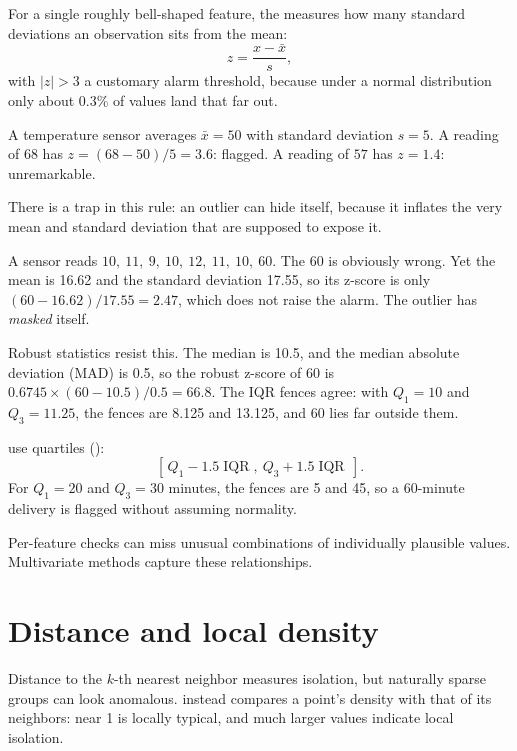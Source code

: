 For a single roughly bell-shaped feature, the  measures how many standard deviations an observation sits from the mean:
\[
  z=\frac{x-\bar{x}}{s},
\]
with $|z|>3$ a customary alarm threshold, because under a normal distribution only about $0.3\%$ of values land that far out.

\begin{workedexample}
A temperature sensor averages $\bar{x}=50$ with standard deviation $s=5$. A reading of $68$ has $z=(68-50)/5=3.6$: flagged. A reading of $57$ has $z=1.4$: unremarkable.
\end{workedexample}

There is a trap in this rule: an outlier can hide itself, because it inflates the very mean and standard deviation that are supposed to expose it.

\begin{workedexample}
A sensor reads $10,\ 11,\ 9,\ 10,\ 12,\ 11,\ 10,\ 60$. The 60 is obviously wrong. Yet the mean is 16.62 and the standard deviation 17.55, so its z-score is only $(60-16.62)/17.55=2.47$, which does not raise the alarm. The outlier has \emph{masked} itself.

Robust statistics resist this. The median is 10.5, and the median absolute deviation (MAD) is 0.5, so the robust z-score of 60 is $0.6745\times(60-10.5)/0.5=66.8$. The IQR fences agree: with $Q_1=10$ and $Q_3=11.25$, the fences are 8.125 and 13.125, and 60 lies far outside them.
\end{workedexample}

 use quartiles ():
\[
  [\,Q_1-1.5\operatorname{IQR},\ Q_3+1.5\operatorname{IQR}\,].
\]
For $Q_1=20$ and $Q_3=30$ minutes, the fences are 5 and 45, so a 60-minute delivery is flagged without assuming normality.

Per-feature checks can miss unusual combinations of individually plausible values. Multivariate methods capture these relationships.

\section{Distance and local density}

Distance to the $k$-th nearest neighbor measures isolation, but naturally sparse groups can look anomalous.  instead compares a point's density with that of its neighbors: near 1 is locally typical, and much larger values indicate local isolation.

